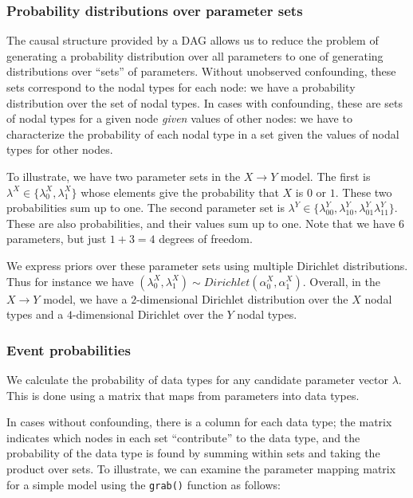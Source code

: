 \documentclass[
  11pt,
  article]{jss}
\begin{document}
\hypertarget{probability-distributions-over-parameter-sets}{%
\subsubsection{Probability distributions over parameter
sets}\label{probability-distributions-over-parameter-sets}}

The causal structure provided by a DAG allows us to reduce the problem
of generating a probability distribution over all parameters to one of
generating distributions over ``sets'' of parameters. Without unobserved
confounding, these sets correspond to the nodal types for each node: we
have a probability distribution over the set of nodal types. In cases
with confounding, these are sets of nodal types for a given node
\emph{given} values of other nodes: we have to characterize the
probability of each nodal type in a set given the values of nodal types
for other nodes.

To illustrate, we have two parameter sets in the \(X \rightarrow Y\)
model. The first is \(\lambda^X \in \{\lambda^X_0, \lambda^X_1\}\) whose
elements give the probability that \(X\) is \(0\) or \(1\). These two
probabilities sum up to one. The second parameter set is
\(\lambda^Y \in \{\lambda^Y_{00}, \lambda^Y_{10}, \lambda^Y_{01} \lambda^Y_{11}\}\).
These are also probabilities, and their values sum up to one. Note that
we have \(6\) parameters, but just \(1 + 3 = 4\) degrees of freedom.

We express priors over these parameter sets using multiple Dirichlet
distributions. Thus for instance we have
\((\lambda^X_0, \lambda^X_1) \sim Dirichlet(\alpha^X_0, \alpha^X_1).\)
Overall, in the \(X \rightarrow Y\) model, we have a \(2\)-dimensional
Dirichlet distribution over the \(X\) nodal types and a
\(4\)-dimensional Dirichlet over the \(Y\) nodal types.

\hypertarget{event-probabilities}{%
\subsubsection{Event probabilities}\label{event-probabilities}}

We calculate the probability of data types for any candidate parameter
vector \(\lambda\). This is done using a matrix that maps from
parameters into data types.

In cases without confounding, there is a column for each data type; the
matrix indicates which nodes in each set ``contribute'' to the data
type, and the probability of the data type is found by summing within
sets and taking the product over sets. To illustrate, we can examine the
parameter mapping matrix for a simple model using the \texttt{grab()}
function as follows:
\end{document}
